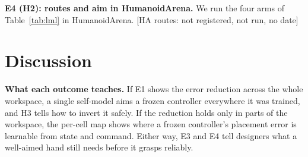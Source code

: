 \documentclass[conference]{IEEEtran}
\newif\ifdraft \drafttrue
\newcommand{\dnote}[1]{\ifdraft{\color{red}\footnotesize[#1]}\fi}
\begin{document}

\textbf{E4 (H2): routes and aim in HumanoidArena.} We run the four arms of Table~\ref{tab:lml} in HumanoidArena.
\dnote{HA routes: not registered, not run, no date}

\section{Discussion}
\textbf{What each outcome teaches.} If E1 shows the error reduction across the whole workspace, a single self-model aims a frozen controller everywhere it was trained, and H3 tells how to invert it safely. If the reduction holds only in parts of the workspace, the per-cell map shows where a frozen controller's placement error is learnable from state and command. Either way, E3 and E4 tell designers what a well-aimed hand still needs before it grasps reliably.




\end{document}
